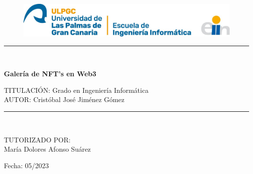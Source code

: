 \begin{titlepage}
    \begin{center}
    \vspace*{0.5in}
        \begin{figure}[htb]
            \begin{center}
            \includegraphics[width=15cm]{Ilustraciones/LogoEII.jpg}
            \end{center}
        \end{figure}

        \vspace*{0.15in}
        \vspace*{0.2in}

        \noindent\hfil\rule{17cm}{0.2mm}\hfil\\
        \vspace*{0.1in}
        \begin{Huge}
            \textbf{Galería de NFT's en Web3} \\
        \end{Huge}

        \vspace*{0.3in}

        \begin{large}
            TITULACIÓN: Grado en Ingeniería Informática \\
            \vspace*{0.1in}
            AUTOR: Cristóbal José Jiménez Gómez \\
        \end{large}
        \vspace*{0.3in}
        
        \noindent\hfil\rule{17cm}{0.2mm}\hfil\\

        \vspace*{0.1in}

        \begin{large}
            TUTORIZADO POR: \\
            María Dolores Afonso Suárez \\
        \end{large}
        
    \vspace*{0.3in}

    Fecha: 05/2023
    \end{center}
\end{titlepage}

